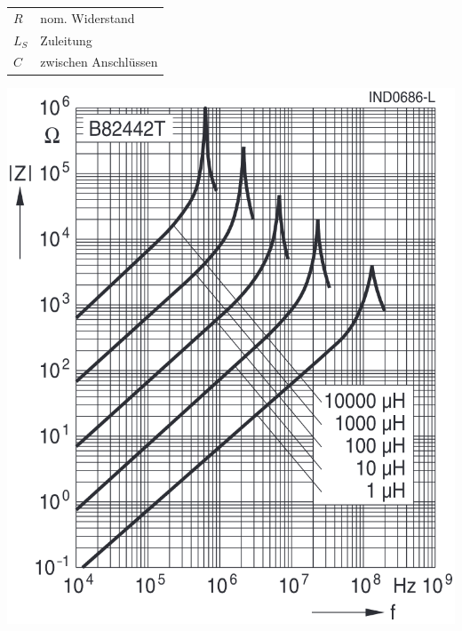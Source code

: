 \begin{minipage}[c]{0.58\columnwidth}

    \begin{tabular}{ll}
        $R$     & nom. Widerstand  \\
        $L_S$   & Zuleitung \\
        $C$     & zwischen Anschlüssen
    \end{tabular}
\end{minipage}
\hfill
\begin{minipage}[c]{0.4\columnwidth}
    \includegraphics[width=\columnwidth]{images/reale_spule_frequenzverlauf.png}

\end{minipage}